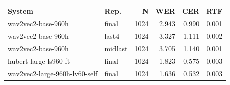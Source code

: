 \begin{tabular}{llrrrr}
\toprule
System & Rep. & N & WER & CER & RTF \\
\midrule
wav2vec2-base-960h & final & 1024 & 2.943 & 0.990 & 0.001 \\
wav2vec2-base-960h & last4 & 1024 & 3.327 & 1.111 & 0.002 \\
wav2vec2-base-960h & midlast & 1024 & 3.705 & 1.140 & 0.001 \\
hubert-large-ls960-ft & final & 1024 & 1.823 & 0.575 & 0.003 \\
wav2vec2-large-960h-lv60-self & final & 1024 & 1.636 & 0.532 & 0.003 \\
\bottomrule
\end{tabular}
